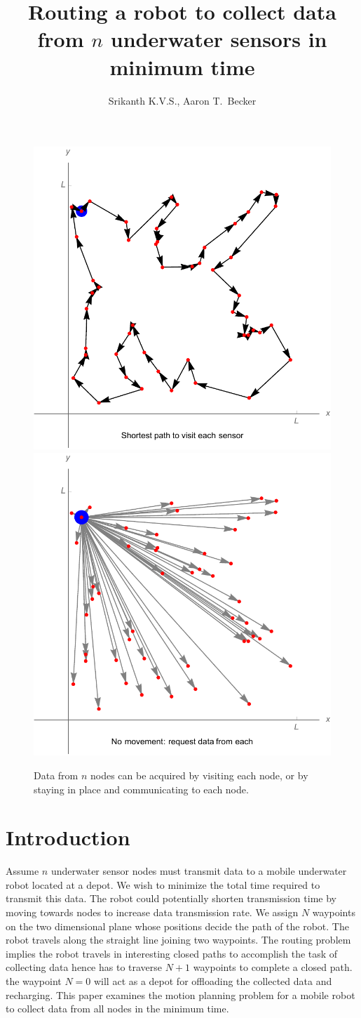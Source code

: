 \documentclass{article}
\begin{document}
\title{Routing a robot to collect data from $n$ underwater sensors in minimum time}
\author{Srikanth K.V.S., Aaron T.\ Becker}
\maketitle

\begin{figure}[htb]
\begin{center}
	\includegraphics[width=0.48\columnwidth]{ShortestPathToSensors}
	\includegraphics[width=0.48\columnwidth]{CommToEachSensor}
\end{center}
\caption{Data from $n$ nodes can be acquired by visiting each node, or by staying in place and communicating to each node.
\label{fig:ShortestPath}}
\end{figure}




\section{Introduction}

 Assume $n$ underwater sensor nodes must transmit data to a mobile underwater robot located at a depot.  We wish to minimize the total time required to transmit this data. 
The robot could potentially shorten transmission time by moving towards nodes to increase data transmission rate.
We assign $N$ waypoints on the two dimensional plane whose positions decide the path of the robot. The robot travels along the straight line joining two waypoints. The routing problem implies the robot travels in interesting closed paths to accomplish the task of collecting data hence has to traverse $N+1$ waypoints to complete a closed path. the waypoint $N = 0$ will act as a depot for offloading the collected data and recharging.
This paper examines the motion planning problem for a mobile robot to collect data from all nodes in the minimum time.  
\end{document}
